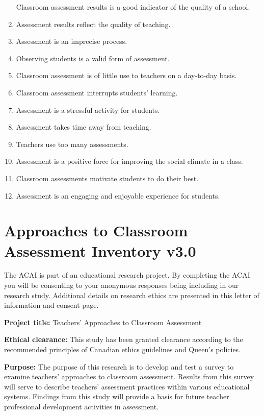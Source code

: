 \documentclass[
]{book}
\begin{document}
\begin{enumerate}
  Classroom assessment results is a good indicator of the quality of a school.
\item
  Assessment results reflect the quality of teaching.
\item
  Assessment is an imprecise process.
\item
  Observing students is a valid form of assessment.
\item
  Classroom assessment is of little use to teachers on a day-to-day basis.
\item
  Classroom assessment interrupts students' learning.
\item
  Assessment is a stressful activity for students.
\item
  Assessment takes time away from teaching.
\item
  Teachers use too many assessments.
\item
  Assessment is a positive force for improving the social climate in a class.
\item
  Classroom assessments motivate students to do their best.
\item
  Assessment is an engaging and enjoyable experience for students.
\end{enumerate}

\hypertarget{approaches-to-classroom-assessment-inventory-v3.0-1}{%
\chapter{Approaches to Classroom Assessment Inventory v3.0}\label{approaches-to-classroom-assessment-inventory-v3.0-1}}

The ACAI is part of an educational research project. By completing the ACAI you will be consenting to your anonymous responses being including in our research study. Additional details on research ethics are presented in this letter of information and consent page.

\textbf{Project title:} Teachers' Approaches to Classroom Assessment

\textbf{Ethical clearance:} This study has been granted clearance according to the recommended principles of Canadian ethics guidelines and Queen's policies.

\textbf{Purpose:} The purpose of this research is to develop and test a survey to examine teachers' approaches to classroom assessment. Results from this survey will serve to describe teachers' assessment practices within various educational systems. Findings from this study will provide a basis for future teacher professional development activities in assessment.
\end{document}
